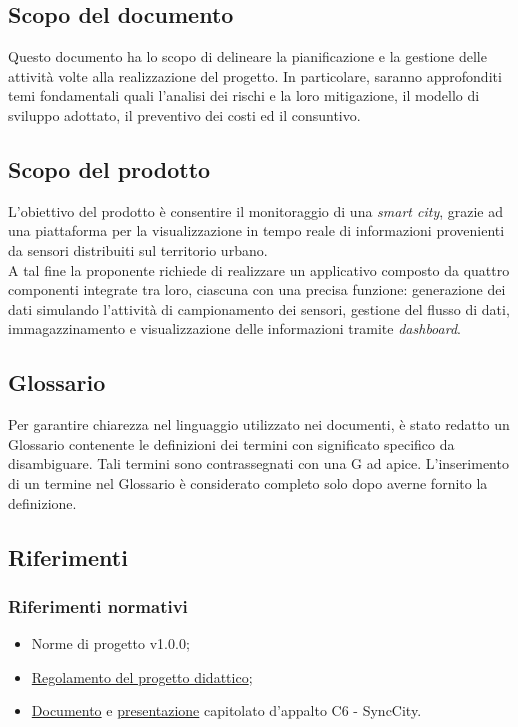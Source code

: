 \subsection{Scopo del documento}
Questo documento ha lo scopo di delineare la pianificazione e la gestione delle attività volte alla realizzazione del progetto. In particolare, saranno approfonditi temi fondamentali quali l'analisi dei rischi e la loro mitigazione, il modello di sviluppo adottato, il preventivo dei costi ed il consuntivo.

\subsection{Scopo del prodotto}
L'obiettivo del prodotto è consentire il monitoraggio di una \textit{smart city}, grazie ad una piattaforma per la visualizzazione in tempo reale di informazioni provenienti da sensori distribuiti sul territorio urbano. \\
A tal fine la proponente richiede di realizzare un applicativo composto da quattro componenti integrate tra loro, ciascuna con una precisa funzione: generazione dei dati simulando l'attività di campionamento dei sensori, gestione del flusso di dati, immagazzinamento e visualizzazione delle informazioni tramite \textit{dashboard}.

\subsection{Glossario}
Per garantire chiarezza nel linguaggio utilizzato nei documenti, è stato redatto un Glossario contenente le definizioni dei termini con significato specifico da disambiguare. Tali termini sono contrassegnati con una G ad apice. L'inserimento di un termine nel Glossario è considerato completo solo dopo averne fornito la definizione.

\subsection{Riferimenti}
\subsubsection{Riferimenti normativi}
\begin{itemize}
\setlength\itemsep{0em}
    \item Norme di progetto v1.0.0;
    \item \href{https://www.math.unipd.it/~tullio/IS-1/2023/Dispense/PD2.pdf}{Regolamento del progetto didattico};
    \item \href{https://www.math.unipd.it/~tullio/IS-1/2023/Progetto/C6.pdf}{Documento} e \href{https://www.math.unipd.it/~tullio/IS-1/2023/Progetto/C6p.pdf}{presentazione} capitolato d'appalto C6 - SyncCity.
\end{itemize}


